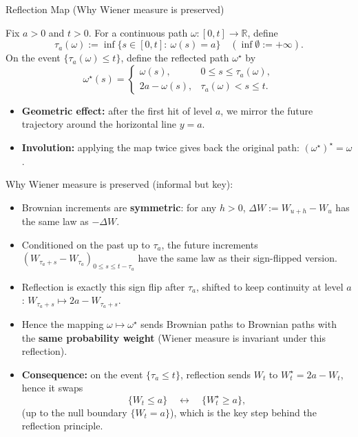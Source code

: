 \documentclass[10pt,aspectratio=169]{beamer}
\begin{document}
\begin{frame}{Reflection Map (Why Wiener measure is preserved)}

Fix \(a>0\) and \(t>0\). For a continuous path \(\omega:[0,t]\to\mathbb{R}\), define
\[
\tau_a(\omega):=\inf\{s\in[0,t]:\ \omega(s)=a\}
\quad (\inf\emptyset:=+\infty).
\]
On the event \(\{\tau_a(\omega)\le t\}\), define the reflected path \(\omega^\star\) by
\[
\omega^\star(s)=
\begin{cases}
\omega(s), & 0\le s\le \tau_a(\omega),\\
2a-\omega(s), & \tau_a(\omega) < s\le t.
\end{cases}
\]

\medskip
\begin{itemize}
  \item \textbf{Geometric effect:}\pause\;
  after the first hit of level \(a\), we mirror the future trajectory around the horizontal line \(y=a\).\pause

  \item \textbf{Involution:}\pause\;
  applying the map twice gives back the original path:
  \((\omega^\star)^\star=\omega\).

  \end{itemize}

\end{frame}


\begin{frame}{Why Wiener measure is preserved (informal but key): }
    
  \begin{itemize}
    \item Brownian increments are \textbf{symmetric}: for any \(h>0\),
    \(\Delta W := W_{u+h}-W_u\) has the same law as \(-\Delta W\).\pause
    \item Conditioned on the past up to \(\tau_a\), the future increments
    \((W_{\tau_a+s}-W_{\tau_a})_{0\le s\le t-\tau_a}\)
    have the same law as their sign-flipped version.\pause
    \item Reflection is exactly this sign flip after \(\tau_a\), shifted to keep continuity at level \(a\):
    \(W_{\tau_a+s}\mapsto 2a-W_{\tau_a+s}\).\pause
    \item Hence the mapping \(\omega\mapsto\omega^\star\) sends Brownian paths to Brownian paths
    with the \textbf{same probability weight} (Wiener measure is invariant under this reflection).\pause
\item \textbf{Consequence:}\pause\;
  on the event \(\{\tau_a\le t\}\), reflection sends \(W_t\) to \(W_t^\star=2a-W_t\), hence it swaps
  \[
  \{W_t\le a\}\quad \longleftrightarrow \quad \{W_t^\star\ge a\},
  \]
  (up to the null boundary \(\{W_t=a\}\)), which is the key step behind the reflection principle.
\end{itemize}

\end{frame}
\end{document}
